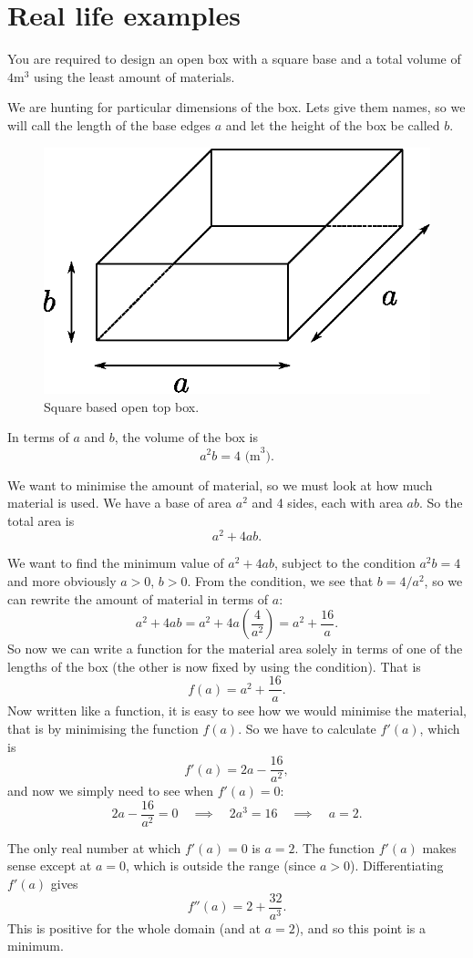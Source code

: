 \section{Real life examples}
\begin{example}
You are required to design an open box with a square base and a total volume of $4\mbox{m}^3$ using the least amount of materials.

We are hunting for particular dimensions of the box. Lets give them names, so we will call the length of the base edges $a$ and let the height of the box be called $b$.

\begin{figure}[H]
\centering
\includegraphics[scale=0.7]{img/real-life-box}
\caption{Square based open top box.}
\label{fig:real-life-box}
\end{figure}

In terms of $a$ and $b$, the volume of the box is 
\[a^2b=4 \mbox{ (m}^3\mbox{)}. \]

We want to minimise the amount of material, so we must look at how much material is used. We have a base of area $a^2$ and 4 sides, each with area $ab$. So the total area is
\[a^2+4ab.\]

We want to find the minimum value of $a^2+4ab$, subject to the condition $a^2b=4$ and more obviously $a>0$, $b>0$. From the condition, we see that $b=4/a^2$, so we can rewrite the amount of material in terms of $a$:
\[a^2+4ab=a^2+4a\left(\frac{4}{a^2}\right)=a^2+\frac{16}{a}.\]
So now we can write a function for the material area solely in terms of one of the lengths of the box (the other is now fixed by using the condition). That is
\[f(a)=a^2+\frac{16}{a}.\]
Now written like a function, it is easy to see how we would minimise the material, that is by minimising the function $f(a)$. So we have to calculate $f'(a)$, which is
\[f'(a)=2a-\frac{16}{a^2},\]
and now we simply need to see when $f'(a)=0$:
\[2a-\frac{16}{a^2}=0\quad \implies \quad 2a^3=16\quad \implies \quad a=2.\]

The only real number at which $f'(a)=0$ is $a=2$. The function $f'(a)$ makes sense except at $a=0$, which is outside the range (since $a>0$).
Differentiating $f'(a)$ gives
\[f''(a)=2+\frac{32}{a^3}.\]
This is positive for the whole domain (and at $a=2$), and so this point is a minimum.
\end{example}

